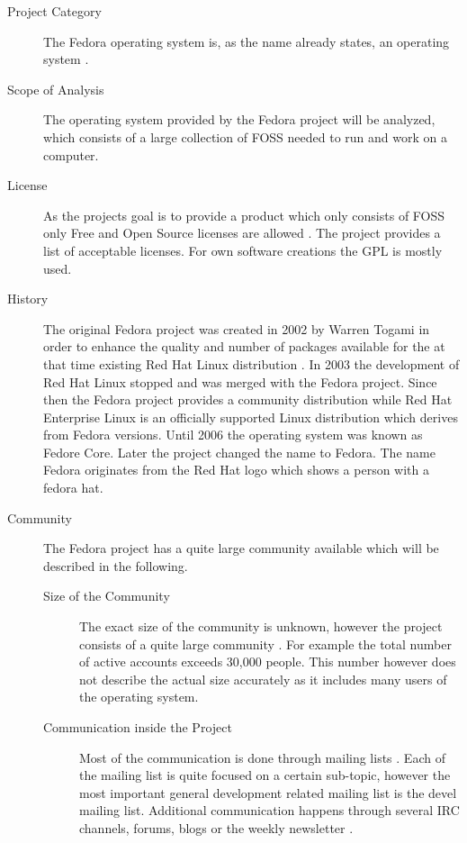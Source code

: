 \begin{description}

  \item[Project Category] The Fedora operating system is, as the name already
    states, an operating system \cite{FedoraAbout}.

  \item[Scope of Analysis] The operating system provided by the Fedora project
    will be analyzed, which consists of a large collection of \ac{FOSS} needed
    to run and work on a computer.

  \item[License] As the projects goal is to provide a product which only
    consists of \ac{FOSS} only Free and Open Source licenses are allowed
    \cite{FedoraLicensing}. The project provides a list of acceptable licenses.
    For own software creations the \ac{GPL} is mostly used.

  \item[History] The original Fedora project was created in 2002 by Warren
    Togami in order to enhance the quality and number of packages available for
    the at that time existing Red Hat Linux distribution
    \cite{FedoraAbout,FedoraTogami,FedoraHistoricalSchedules}. In 2003 the
    development of Red Hat Linux stopped and was merged with the Fedora
    project. Since then the Fedora project provides a community distribution
    while Red Hat Enterprise Linux is an officially supported Linux
    distribution which derives from Fedora versions. Until 2006 the operating
    system was known as Fedore Core. Later the project changed the name to
    Fedora. The name Fedora originates from the Red Hat logo which shows a
    person with a fedora hat.

  \item[Community] The Fedora project has a quite large community available
    which will be described in the following.

  \begin{description}

    \item[Size of the Community] The exact size of the community is unknown,
      however the project consists of a quite large community
      \cite{FedoraStatistics}. For example the total number of active accounts
      exceeds 30,000 people. This number however does not describe the actual
      size accurately as it includes many users of the operating system.

    \item[Communication inside the Project] Most of the communication is done
      through mailing lists \cite{FedoraAbout,FedoraJoin,FedoraSIG}. Each of
      the mailing list is quite focused on a certain sub-topic, however the
      most important general development related mailing list is the devel
      mailing list. Additional communication happens through several \ac{IRC}
      channels, forums, blogs or the weekly newsletter
      \cite{FedoraFWN,FedoraCommunicating}.


\end{description}
\end{description}
